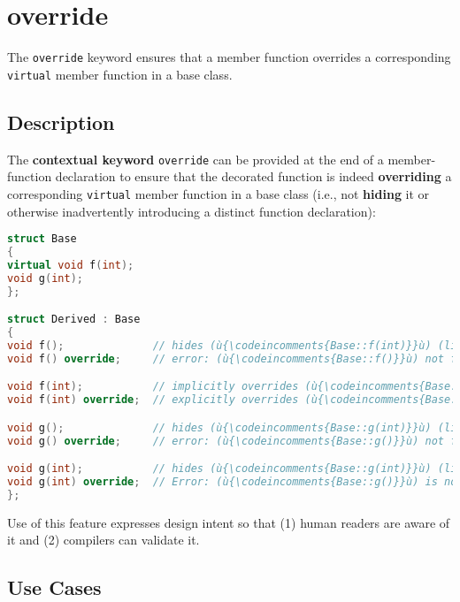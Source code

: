 \newpage
\section[\tt{override}]{{\SecCode override}}\label{override}


The \texttt{override} keyword ensures that a member function overrides a corresponding \texttt{virtual} member function in a base class.

\subsection[Description]{Description}\label{description}

The \textbf{contextual keyword} \texttt{override} can be provided at the
end of a member-function declaration to ensure that the decorated
function is indeed \textbf{overriding} a corresponding \texttt{virtual}
member function in a base class (i.e., not \textbf{hiding} it or
otherwise inadvertently introducing a distinct function declaration):

\begin{lstlisting}[language=C++]
struct Base
{
virtual void f(int);
void g(int);
};

struct Derived : Base
{
void f();              // hides (ù{\codeincomments{Base::f(int)}}ù) (likely mistake)
void f() override;     // error: (ù{\codeincomments{Base::f()}}ù) not found

void f(int);           // implicitly overrides (ù{\codeincomments{Base::f(int)}}ù)
void f(int) override;  // explicitly overrides (ù{\codeincomments{Base::f(int)}}ù)

void g();              // hides (ù{\codeincomments{Base::g(int)}}ù) (likely mistake)
void g() override;     // error: (ù{\codeincomments{Base::g()}}ù) not found

void g(int);           // hides (ù{\codeincomments{Base::g(int)}}ù) (likely mistake)
void g(int) override;  // Error: (ù{\codeincomments{Base::g()}}ù) is not (ù{\codeincomments{virtual}}ù).
};
\end{lstlisting}

\noindent Use of this feature expresses design intent so that (1) human readers
are aware of it and (2) compilers can validate it.

\subsection[Use Cases]{Use Cases}\label{use-cases}

